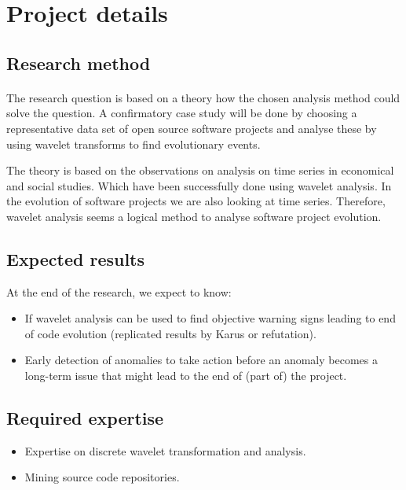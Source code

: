 \section{Project details}



\subsection{Research method}
\paragraph{}
The research question is based on a theory how the chosen analysis method could
solve the question. A confirmatory case study will be done by choosing a
representative data set of open source software projects and analyse these by
using wavelet transforms to find evolutionary events.

The theory is based on the observations on analysis on time series in
economical and social studies. Which have been successfully done using wavelet
analysis. In the evolution of software projects we are also looking at time
series. Therefore, wavelet analysis seems a logical method to analyse software
project evolution.

\subsection{Expected results}
At the end of the research, we expect to know:
\begin{itemize}
	\item If wavelet analysis can be used to find objective warning signs leading
	to end of code evolution (replicated results by Karus or refutation).
	\item Early detection of anomalies to take action before an anomaly becomes a
	long-term issue that might lead to the end of (part of) the project.
\end{itemize}

\subsection{Required expertise}
\begin{itemize}
	\item Expertise on discrete wavelet transformation and analysis.
	\item Mining source code repositories.
\end{itemize}

